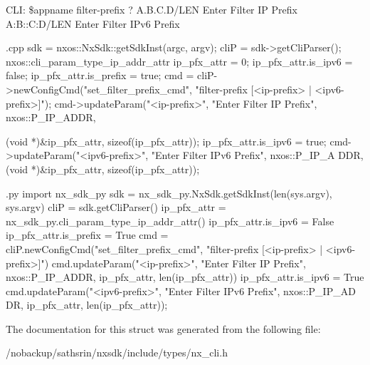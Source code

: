 CLI: \$appname filter-\/prefix ? A.B.C.D/LEN Enter Filter IP Prefix A:B::C:D/LEN Enter Filter IPv6 Prefix


\begin{DoxyCode}
 {.cpp}
       sdk = nxos::NxSdk::getSdkInst(argc, argv);
       cliP = sdk->getCliParser();
       nxos::cli_param_type_ip_addr_attr ip_pfx_attr = {0};
       ip_pfx_attr.is_ipv6 = false;
       ip_pfx_attr.is_prefix = true;
       cmd = cliP->newConfigCmd("set_filter_prefix_cmd",
                                "filter-prefix [<ip-prefix> | <ipv6-prefix>]");
       cmd->updateParam("<ip-prefix>", "Enter Filter IP Prefix", nxos::P_IP_ADDR,
      
                        (void *)&ip_pfx_attr, sizeof(ip_pfx_attr));
       ip_pfx_attr.is_ipv6 = true;
       cmd->updateParam("<ipv6-prefix>", "Enter Filter IPv6 Prefix", nxos::P_IP_A
      DDR,
                        (void *)&ip_pfx_attr, sizeof(ip_pfx_attr));
\end{DoxyCode}



\begin{DoxyCode}
 {.py}
       import nx_sdk_py
       sdk = nx_sdk_py.NxSdk.getSdkInst(len(sys.argv), sys.argv)
       cliP = sdk.getCliParser()
       ip_pfx_attr = nx_sdk_py.cli_param_type_ip_addr_attr()
       ip_pfx_attr.is_ipv6 = False
       ip_pfx_attr.is_prefix = True
       cmd = cliP.newConfigCmd("set_filter_prefix_cmd",
                               "filter-prefix [<ip-prefix> | <ipv6-prefix>]")
       cmd.updateParam("<ip-prefix>", "Enter Filter IP Prefix", nxos::P_IP_ADDR,
                       ip_pfx_attr, len(ip_pfx_attr))
       ip_pfx_attr.is_ipv6 = True
       cmd.updateParam("<ipv6-prefix>", "Enter Filter IPv6 Prefix", nxos::P_IP_AD
      DR,
                       ip_pfx_attr, len(ip_pfx_attr));
\end{DoxyCode}
 

The documentation for this struct was generated from the following file:\begin{DoxyCompactItemize}
\item 
/nobackup/sathsrin/nxsdk/include/types/nx\_\-cli.h\end{DoxyCompactItemize}
